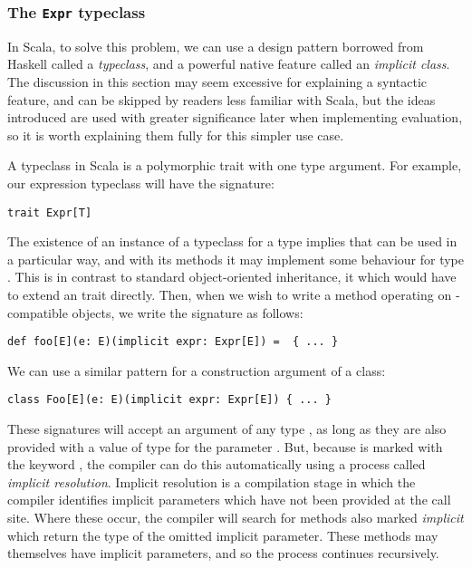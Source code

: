 \subsubsection{The \lstinline{Expr} typeclass}
In Scala, to solve this problem, we can use a design pattern borrowed from Haskell called a \textit{typeclass}, and a powerful native feature called an \textit{implicit class}. The discussion in this section may seem excessive for explaining a syntactic feature, and can be skipped by readers less familiar with Scala, but the ideas introduced are used with greater significance later when implementing evaluation, so it is worth explaining them fully for this simpler use case.

A typeclass in Scala is a polymorphic trait with one type argument. For example, our expression typeclass will have the signature:
\vs \begin{lstlisting}
trait Expr[T]
\end{lstlisting} \vs
The existence of an instance of a typeclass for a type  implies that  can be used in a particular way, and with its methods it may implement some behaviour for type . This is in contrast to standard object-oriented inheritance, it which  would have to extend an  trait directly. Then, when we wish to write a method operating on -compatible objects, we write the signature as follows:
\vs \begin{lstlisting}
def foo[E](e: E)(implicit expr: Expr[E]) =  { ... }
\end{lstlisting} \vs
We can use a similar pattern for a construction argument of a class:
\vs \begin{lstlisting}
class Foo[E](e: E)(implicit expr: Expr[E]) { ... }
\end{lstlisting} \vs

These signatures will accept an argument of any type , as long as they are also provided with a value of type  for the parameter . But, because  is marked with the keyword , the compiler can do this automatically using a process called \textit{implicit resolution}. Implicit resolution is a compilation stage in which the compiler identifies implicit parameters which have not been provided at the call site. Where these occur, the compiler will search for methods also marked \textit{implicit} which return the type of the omitted implicit parameter. These methods may themselves have implicit parameters, and so the process continues recursively.


